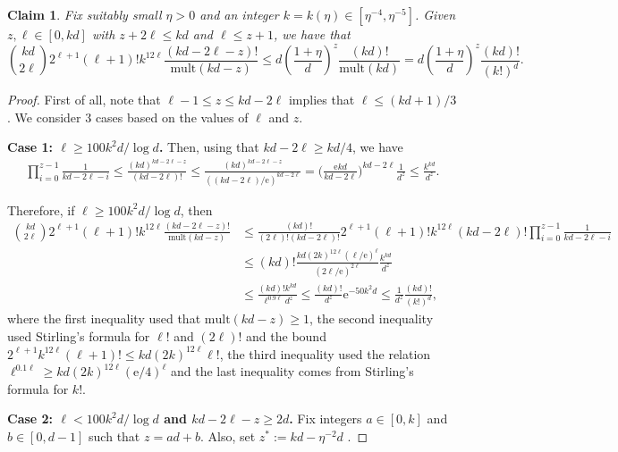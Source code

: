 \documentclass[reqno,final,a4paper]{amsart}
\newtheorem{claim}[thm]{Claim}
\theoremstyle{definition}
\newcommand{\mult}{\mathrm{mult}}
\def\e{\mathrm{e}}
\newcommand{\1}{\mathbbm{1}}
\begin{document}
\begin{claim}
Fix suitably small $\eta>0$ and an integer $k = k(\eta)\in [\eta^{-4},\eta^{-5}]$. Given $z,\ell\in [0,kd]$ with $z+2\ell \leq kd$ and $\ell\leq z+1$, we have that
\begin{equation}\label{eq:mult}
 \binom{kd}{2\ell} 2^{\ell+1} (\ell+1)! k^{12\ell} 
  \frac{(kd-2\ell-z)!}{\mult(kd-z)}
\leq d \left(\frac{1+\eta}{d} \right)^z \frac{(kd)!}{\mult(kd)} = d  \left(\frac{1+\eta}{d} \right)^z \frac{(kd)!}{(k!)^d}.
\end{equation}
\end{claim}
\begin{proof}
First of all, note that $\ell-1\le z\le kd-2\ell$ implies that $\ell\le (kd+1)/3$.
We consider 3 cases based on the values of $\ell$ and $z$.

\vspace{0.5em}
\noindent 
\textbf{Case 1:  $\ell\geq 100k^2d/\log d$.} Then, using that $kd-2\ell\ge kd/4$, we have
\begin{align*}
     \prod_{i=0}^{z-1} \frac{1}{kd-2\ell-i} \leq \frac{(kd)^{kd-2\ell-z}}{(kd-2\ell)!}\leq \frac{(kd)^{kd-2\ell-z}}{((kd-2\ell)/\e)^{kd-2\ell}} =\bigg(\frac{\e kd}{kd-2\ell}\bigg)^{kd-2\ell}\frac{1}{d^z} \leq  \frac{k^{kd}}{d^{z}}.
\end{align*}

Therefore, if $\ell\geq 100k^2d/\log d$, then
\begin{align*}
\binom{kd}{2\ell} 2^{\ell+1} (\ell+1)! k^{12\ell} \frac{(kd-2\ell-z)!}{\mult(kd-z)}
& \le \frac{(kd)!}{(2\ell)!(kd-2\ell)!} 2^{\ell+1} (\ell+1)! k^{12\ell} (kd-2\ell)!\prod_{i=0}^{z-1} \frac{1}{kd-2\ell-i}
\\ &\leq (kd)! \frac{kd (2k)^{12\ell} (\ell/\e)^{\ell}}{(2\ell/\e)^{2\ell}}  \frac{k^{kd}}{d^z}
\\ &\leq  \frac{(kd)! k^{kd}}{\ell^{0.9\ell} d^z} \leq  \frac{(kd)!}{d^z} \e^{-50k^2 d} \leq \frac{1}{d^z} \frac{(kd)!}{(k!)^d}, 
\end{align*}
where the first inequality used that $\mult(kd-z)\ge 1$, the second inequality used Stirling's formula for $\ell!$ and $(2\ell)!$ and the bound $2^{\ell+1} k^{12\ell} (\ell+1)!\le kd (2k)^{12\ell} \ell!$, the third inequality used the relation $\ell^{0.1\ell}\ge kd (2k)^{12\ell} (\e/4)^{\ell}$ and the last inequality comes from Stirling's formula for $k!$.

\vspace{3mm}
\noindent \textbf{Case 2:  $\ell < 100k^2d/\log d$ and $kd-2\ell-z\geq 2d$.} Fix integers $a\in [0,k]$ and $b\in [0,d-1]$ such that $z=ad+b$. Also, set $z^*:= kd -\eta^{-2}d$ .


\end{proof}
\end{document}
